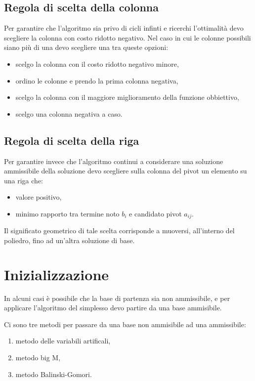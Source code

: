 \subsection{Regola di scelta della colonna}
Per garantire che l'algoritmo sia privo di cicli infinti e ricerchi l'ottimalità devo scegliere la colonna con costo ridotto negativo. 
Nel caso in cui le colonne possibili siano più di una devo scegliere una tra queste opzioni:
\begin{itemize}
	\item scelgo la colonna con il costo ridotto negativo minore,
	\item ordino le colonne e prendo la prima colonna negativa,
	\item scelgo la colonna con il maggiore miglioramento della funzione obbiettivo,
	\item scelgo una colonna negativa a caso. 
\end{itemize}

\subsection{Regola di scelta della riga}
Per garantire invece che l'algoritmo continui a considerare una soluzione ammissibile della soluzione devo scegliere sulla colonna del pivot un elemento su una riga che:
\begin{itemize}
	\item valore positivo,
	\item minimo rapporto tra termine noto $b_i$ e candidato pivot $a_{ij}$.
\end{itemize}

Il significato geometrico di tale scelta corrisponde a muoversi, all'interno del poliedro, fino ad un'altra soluzione di base.

\section{Inizializzazione}

In alcuni casi è possibile che la base di partenza sia non ammissibile, e per applicare l'algoritmo del simplesso devo partire da una base ammisibile. 

Ci sono tre metodi per passare da una base non ammisibile ad una ammissibile:

\begin{enumerate}
	\item metodo delle variabili artificali,
	\item metodo big M,
	\item metodo Balinski-Gomori.
\end{enumerate}

